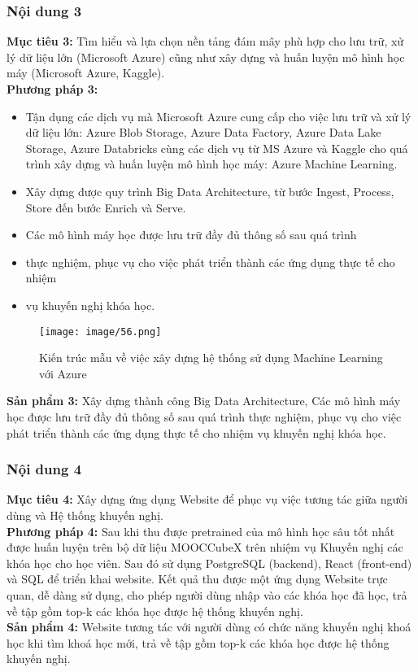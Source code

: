 \subsubsection{Nội dung 3}
\textbf{Mục tiêu 3:} Tìm hiểu và lựa chọn nền tảng đám mây phù hợp cho lưu trữ, xử lý dữ liệu lớn (Microsoft Azure) cũng như xây dựng và huấn luyện mô hình học máy (Microsoft Azure, Kaggle).\\
\textbf{Phương pháp 3:}
\begin{itemize}
    \item Tận dụng các dịch vụ mà Microsoft Azure cung cấp cho việc lưu trữ và xử lý dữ liệu lớn: Azure Blob Storage, Azure Data Factory, Azure Data Lake Storage, Azure Databricks cùng các dịch vụ từ MS Azure và Kaggle cho quá trình xây dựng và huấn luyện mô hình học máy: Azure Machine Learning.
    \item Xây dựng được quy trình Big Data Architecture, từ bước Ingest, Process, Store đến bước Enrich và Serve.
    \item Các mô hình máy học được lưu trữ đầy đủ thông số sau quá trình
    \item thực nghiệm, phục vụ cho việc phát triển thành các ứng dụng thực tế cho nhiệm
    \item vụ khuyến nghị khóa học.
\end{itemize}
\begin{figure}[h]
    \centering
    \texttt{[image: image/56.png]}
    \caption{Kiến trúc mẫu về việc xây dựng hệ thống sử dụng Machine Learning với Azure}
\end{figure}
\textbf{Sản phẩm 3:} Xây dựng thành công Big Data Architecture, Các mô hình máy học được lưu trữ đầy đủ thông số sau quá trình thực nghiệm, phục vụ cho việc phát triển thành các ứng dụng thực tế cho nhiệm vụ khuyến nghị khóa học.
\subsubsection{Nội dung 4}
\textbf{Mục tiêu 4:} Xây dựng ứng dụng Website để phục vụ việc tương tác giữa người
dùng và Hệ thống khuyến nghị.\\
\textbf{Phương pháp 4:} Sau khi thu được pretrained của mô hình học sâu tốt nhất được huấn luyện trên bộ dữ liệu MOOCCubeX trên nhiệm vụ Khuyến nghị các khóa học cho học viên. Sau đó sử dụng PostgreSQL (backend), React (front-end) và SQL để triển khai website. Kết quả thu được một ứng dụng Website trực quan, dễ dàng sử dụng, cho phép người dùng nhập vào các khóa học đã học, trả về tập gồm top-k các khóa học được hệ thống khuyến nghị.\\
\textbf{Sản phẩm 4:} Website tương tác với người dùng có chức năng khuyến nghị khoá học khi tìm khoá học mới, trả về tập gồm top-k các khóa học được hệ thống khuyến nghị.
